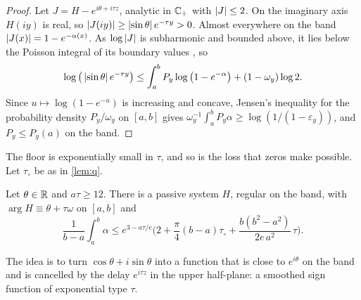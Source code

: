\begin{proof}
Let $J=H-e^{i\theta+i\tau z}$, analytic in $\mathbb C_{+}$ with $\left|J\right|\le2$. On the
imaginary axis $H(iy)$ is real, so
$\left|J(iy)\right|\ge\left|\sin\theta\right|e^{-\tau y}>0$. Almost everywhere on the band
$\left|J(x)\right|=1-e^{-\alpha(x)}$. As $\log\left|J\right|$ is subharmonic and bounded
above, it lies below the Poisson integral of its boundary values
\cite[Ch.~II]{garnett}, so
\[
\log\big(\left|\sin\theta\right|e^{-\tau y}\big)\le\int_a^bP_y\log\big(1-e^{-\alpha}\big)
+(1-\omega_y)\log2 .
\]
Since $u\mapsto\log(1-e^{-u})$ is increasing and concave, Jensen's
inequality for the probability density $P_y/\omega_y$ on $[a,b]$ gives
$\omega_y^{-1}\int_a^bP_y\alpha\ge\log(1/(1-\varepsilon_y))$, and $P_y\le P_y(a)$
on the band.
\end{proof}

The floor is exponentially small in $\tau$, and so is the loss that zeros
make possible. Let $\tau_\circ$ be as in \cref{lem:q}.

\begin{theorem}\label{thm:expdecay}
Let $\theta\in\mathbb R$ and $a\tau\ge12$. There is a passive system $H$, regular on the
band, with $\arg H\equiv\theta+\tau\omega$ on $[a,b]$ and
\[
\frac1{b-a}\int_a^b\alpha\le e^{3-a\tau/e}\Big(2+\frac\pi4(b-a)\tau_\circ
+\frac{b(b^2-a^2)}{2e\,a^2}\,\tau\Big).
\]
\end{theorem}

The idea is to turn $\cos\theta+i\sin\theta$ into a function that is close to
$e^{i\theta}$ on the band and is cancelled by the delay $e^{i\tau z}$ in the upper
half-plane: a smoothed sign function of exponential type $\tau$.

